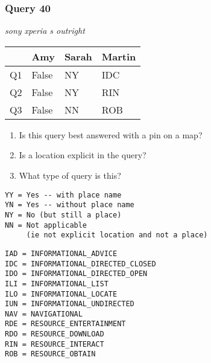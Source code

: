 \begin{frame}[fragile]
\frametitle{Query 40}
\vspace{1em}

\emph{sony xperia s outright}

\vfill

\begin{table}
  \centering
  \begin{tabular}{ l l l l }
    & \textbf{Amy} & \textbf{Sarah} & \textbf{Martin}\\
    \toprule
    Q1 & False & NY & IDC\\
Q2 & False & NY & RIN\\
Q3 & False & NN & ROB\\
    \bottomrule
  \end{tabular}
\end{table}

\vfill

\tiny{

\begin{enumerate}
\item Is this query best answered with a pin on a map?
\item Is a location explicit in the query?
\item What type of query is this?
\end{enumerate}

\vfill

\begin{multicols}{2}
\begin{verbatim}
YY = Yes -- with place name
YN = Yes -- without place name
NY = No (but still a place)
NN = Not applicable 
     (ie not explicit location and not a place)
\end{verbatim}

\columnbreak
\begin{verbatim}
IAD = INFORMATIONAL_ADVICE
IDC = INFORMATIONAL_DIRECTED_CLOSED
IDO = INFORMATIONAL_DIRECTED_OPEN
ILI = INFORMATIONAL_LIST
ILO = INFORMATIONAL_LOCATE
IUN = INFORMATIONAL_UNDIRECTED
NAV = NAVIGATIONAL
RDE = RESOURCE_ENTERTAINMENT
RDO = RESOURCE_DOWNLOAD
RIN = RESOURCE_INTERACT
ROB = RESOURCE_OBTAIN
\end{verbatim}
\end{multicols}
}

\end{frame}


